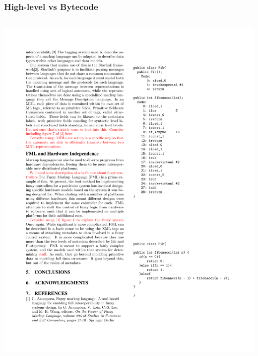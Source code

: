 \documentclass{beamer}
\begin{document}
\begin{frame}[fragile]
  \frametitle{High-level vs Bytecode}
  \begin{columns}
  \begin{column}{0.65\textwidth}
  \includegraphics[scale=0.8]{graphics/JavaFib.pdf}
  \end{column}
  

\end{columns}
\end{frame}
\end{document}
